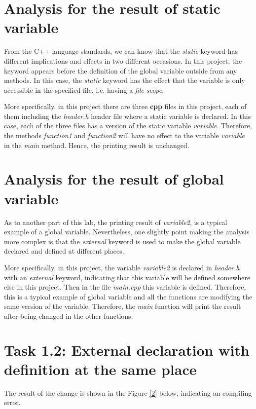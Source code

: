 \documentclass[a4paper]{report}
\begin{document}
\section{Analysis for the result of static variable}
From the C++ language standards, we can know that the \emph{static} keyword has different implications and effects in two different occasions. In this project, the keyword appears before the definition of the global variable outside from any methods. In this case, the \emph{static} keyword has the effect that the variable is only accessible in the specified file, i.e. having a \emph{file scope}.
\par
More specifically, in this project there are three \textbf{cpp} files in this project, each of them including the \emph{header.h} header file where a static variable is declared. In this case, each of the three files has a version of the static variable \emph{variable}. Therefore, the methods \emph{function1} and \emph{function2} will have no effect to the variable \emph{variable} in the \emph{main} method. Hence, the printing result is unchanged.

\section{Analysis for the result of global variable}
As to another part of this lab, the printing result of \emph{variable2}, is a typical example of a global variable. Nevertheless, one slightly point making the analysis more complex is that the \emph{external} keyword is used to make the global variable declared and defined at different places. 
\par
More specifically, in this project, the variable \emph{variable2} is declared in \emph{header.h} with an \emph{external} keyword, indicating that this variable will be defined somewhere else in this project. Then in the file \emph{main.cpp} this variable is defined. Therefore, this is a typical example of global variable and all the functions are modifying the same version of the variable. Therefore, the \emph{main} function will print the result after being changed in the other functions.

\section{Task 1.2: External declaration with definition at the same place}
The result of the change is shown in the Figure \ref{2} below, indicating an compiling error.
\end{document}
